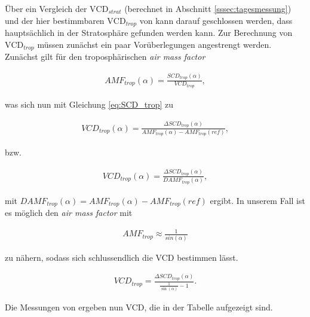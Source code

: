 \documentclass[12pt, a4paper, bibliography=totoc]{scrartcl}
\begin{document}
\begin{multicols}{2}
Über ein Vergleich der $\text{VCD}_{strat}$ (berechnet in Abschnitt \ref{sssec:tagesmessung})
und der hier bestimmbaren $\text{VCD}_{trop}$  von  kann darauf geschlossen werden, dass  hauptsächlich in der Stratosphäre gefunden werden kann.
Zur Berechnung von $\text{VCD}_{trop}$ müssen zunächst ein paar Vorüberlegungen angestrengt werden.
Zunächst gilt für den troposphärischen \textit{air mass factor}

\begin{align}
AMF_{trop}(\alpha) = \frac{SCD_{trop}(\alpha)}{VCD_{trop}},
\end{align}

was sich nun mit Gleichung \ref{eq:SCD_trop} zu 

\begin{align}
    VCD_{trop}(\alpha) = \frac{\Delta SCD_{trop}(\alpha)}{AMF_{trop}(\alpha)-AMF_{trop}(ref)}, 
\end{align} 

bzw.

\begin{align}
VCD_{trop}(\alpha) = \frac{\Delta SCD_{trop}(\alpha)}{DAMF_{trop}(\alpha)}, 
\end{align}  

mit $DAMF_{trop}(\alpha) = AMF_{trop}(\alpha)-AMF_{trop}(ref)$ ergibt.
In unserem Fall ist es möglich den \textit{air mass factor} mit

\begin{align}
AMF_{trop} \approx \frac{1}{sin(\alpha)}
\end{align}

zu nähern, sodass sich schlussendlich die VCD bestimmen lässt.

\begin{align}
VCD_{trop} = \frac{\Delta SCD_{trop}(\alpha)}{\frac{1}{\sin(\alpha)}-1}.
\end{align}

Die Messungen von  ergeben nun VCD, die in der Tabelle aufgezeigt sind.

\begin{center}
	

\end{center}
\end{multicols}
\end{document}
